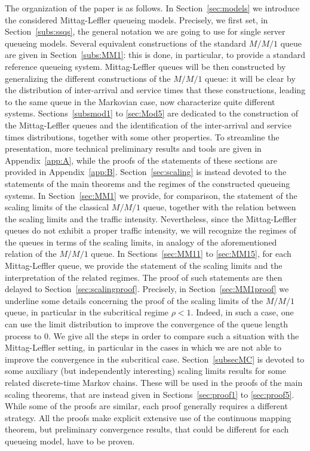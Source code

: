 \documentclass[]{amsart}
\numberwithin{equation}{section}
\theoremstyle{remark}
\theoremstyle{definition}
\begin{document}
The organization of the paper is as follows. In Section~\ref{sec:models} we introduce the considered Mittag-Leffler queueing models. Precisely, we first set, in Section~\ref{subs:ssqs}, the general notation we are going to use for single server queueing models. Several equivalent constructions of the standard $M/M/1$ queue are given in Section~\ref{subs:MM1}: this is done, in particular, to provide a standard reference queueing system. Mittag-Leffler queues will be then constructed by generalizing the different constructions of the $M/M/1$ queue: it will be clear by the distribution of inter-arrival and service times that these constructions, leading to the same queue in the Markovian case, now characterize quite different systems. Sections~\ref{subsmod1} to \ref{sec:Mod5} are dedicated to the construction of the Mittag-Leffler queues and the identification of the inter-arrival and service times distributions, together with some other properties. To streamline the presentation, more technical preliminary results and tools are given in Appendix~\ref{app:A}, while the proofs of the statements of these sections are provided in Appendix~\ref{app:B}. Section~\ref{sec:scaling} is instead devoted to the statements of the main theorems and the regimes of the constructed queueing systems. In Section~\ref{sec:MM1} we provide, for comparison, the statement of the scaling limits of the classical $M/M/1$ queue, together with the relation between the scaling limits and the traffic intensity. Nevertheless, since the Mittag-Leffler queues do not exhibit a proper traffic intensity, we will recognize the regimes of the queues in terms of the scaling limits, in analogy of the aforementioned relation of the $M/M/1$ queue. In Sections~\ref{sec:MM11} to \ref{sec:MM15}, for each Mittag-Leffler queue, we provide the statement of the scaling limits and the interpretation of the related regimes. The proof of such statements are then delayed to Section~\ref{sec:scalingproof}. Precisely, in Section~\ref{sec:MM1proof} we underline some details concerning the proof of the scaling limits of the $M/M/1$ queue, in particular in the subcritical regime $\rho<1$. Indeed, in such a case, one can use the limit distribution to improve the convergence of the queue length process to $0$. We give all the steps in order to compare such a situation with the Mittag-Leffler setting, in particular in the cases in which we are not able to improve the convergence in the subcritical case. Section~\ref{subsecMC} is devoted to some auxiliary (but independently interesting) scaling limits results for some related discrete-time Markov chains. These will be used in the proofs of the main scaling theorems, that are instead given in Sections~\ref{sec:proof1} to \ref{sec:proof5}. While some of the proofs are similar, each proof generally requires a different strategy. All the proofs make explicit extensive use of the continuous mapping theorem, but preliminary convergence results, that could be different for each queueing model, have to be proven.
\end{document}

